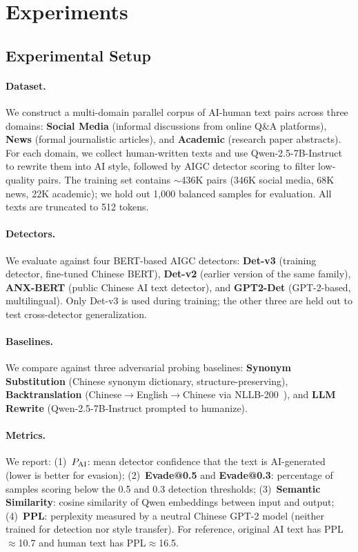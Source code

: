 \section{Experiments}
\label{sec:experiments}

\subsection{Experimental Setup}
\label{sec:setup}

\paragraph{Dataset.}
We construct a multi-domain parallel corpus of AI-human text pairs across three domains:
\textbf{Social Media} (informal discussions from online Q\&A platforms),
\textbf{News} (formal journalistic articles), and
\textbf{Academic} (research paper abstracts).
For each domain, we collect human-written texts and use Qwen-2.5-7B-Instruct to rewrite them into AI style, followed by AIGC detector scoring to filter low-quality pairs.
The training set contains ${\sim}$436K pairs (346K social media, 68K news, 22K academic); we hold out 1{,}000 balanced samples for evaluation.
All texts are truncated to 512 tokens.

\paragraph{Detectors.}
We evaluate against four BERT-based AIGC detectors:
\textbf{Det-v3} (training detector, fine-tuned Chinese BERT),
\textbf{Det-v2} (earlier version of the same family),
\textbf{ANX-BERT} (public Chinese AI text detector), and
\textbf{GPT2-Det} (GPT-2-based, multilingual).
Only Det-v3 is used during training; the other three are held out to test cross-detector generalization.

\paragraph{Baselines.}
We compare against three adversarial probing baselines:
\textbf{Synonym Substitution} (Chinese synonym dictionary, structure-preserving),
\textbf{Backtranslation} (Chinese$\to$English$\to$Chinese via NLLB-200~\citep{fan2023nllb}), and
\textbf{LLM Rewrite} (Qwen-2.5-7B-Instruct prompted to humanize).

\paragraph{Metrics.}
We report:
(1)~$P_{\text{AI}}$: mean detector confidence that the text is AI-generated (lower is better for evasion);
(2)~\textbf{Evade@0.5} and \textbf{Evade@0.3}: percentage of samples scoring below the 0.5 and 0.3 detection thresholds;
(3)~\textbf{Semantic Similarity}: cosine similarity of Qwen embeddings between input and output;
(4)~\textbf{PPL}: perplexity measured by a neutral Chinese GPT-2 model (neither trained for detection nor style transfer).
For reference, original AI text has PPL${\approx}$10.7 and human text has PPL${\approx}$16.5.

